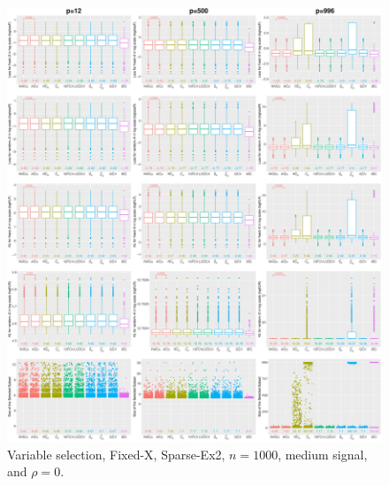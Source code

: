 \begin{figure}[!ht]
\centering
\includegraphics[width=\textwidth]{figures/supplement/fixedx/subset_selection/Sparse-Ex2_n1000_msnr_rho0.eps}
\caption{Variable selection, Fixed-X, Sparse-Ex2, $n=1000$, medium signal, and $\rho=0$.}
\end{figure}
\clearpage
